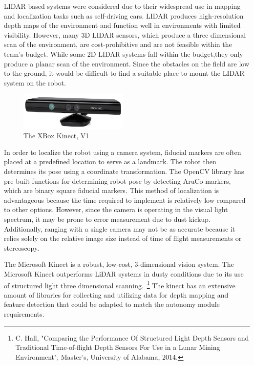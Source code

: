 \documentclass[class=article, crop=false]{standalone}
\begin{document}
	LIDAR based systems were considered due to their widespread use in mapping and localization tasks such as self-driving cars. LIDAR produces high-resolution depth maps of the environment and function  well in environments with limited visibility. However, many 3D LIDAR sensors, which produce a three dimensional scan of the environment, are cost-prohibitive and are not feasible within the team’s budget. While some 2D LIDAR systems fall within the budget,they only produce a planar scan of the environment. Since the obstacles on the field are low to the ground, it would be difficult to find a suitable place to mount the LIDAR system on the robot. 
	
	\begin{figure}
	\centering
	 \includegraphics[width=0.48\textwidth]{09_Figures/xbox-360-kinect.png}
	 \caption{The XBox Kinect, V1}
	 \label{fig:kinect-pic}
	\end{figure}
	
	In order to localize the robot using a camera system, fiducial markers are often placed at a predefined location to serve as a landmark. The robot then determines its pose using a coordinate transformation. The OpenCV library has pre-built functions for determining robot pose by detecting AruCo markers, which are binary square fiducial markers. This method of localization is advantageous because the time required to implement is relatively low compared to other options. However, since the camera is operating in the visual light spectrum, it may be prone to error measurement due to dust kickup. Additionally, ranging with a single camera may not be as accurate because it relies solely on the relative image size instead of time of flight measurements or stereoscopy.
	
	The Microsoft Kinect is a robust, low-cost, 3-dimensional vision system. The Microsoft Kinect outperforms LiDAR systems in dusty conditions due to its use of structured light three dimensional scanning.~\footnote{C. Hall, "Comparing the Performance Of Structured Light Depth Sensors and Traditional Time-of-flight Depth Sensors For Use in a Lunar Mining Environment", Master's, University of Alabama, 2014.} The kinect has an extensive amount of libraries for collecting and utilizing data for depth mapping and feature detection that could be adapted to match the autonomy module requirements. 
	
\end{document}
